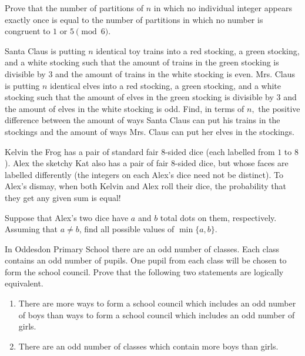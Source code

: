 \documentclass{article}
\begin{document}
\begin{req}[]{6}
Prove that the number of partitions of $n$ in which no individual integer appears exactly once is equal to the number of partitions in which no number is congruent to $1$ or $5\pmod{6}.$
\end{req}


\begin{prob}[ART 2020/4]{6}
Santa Claus is putting $n$ identical toy trains into a red stocking, a green stocking, and a white stocking such that the amount of trains in the green stocking is divisible by $3$ and the amount of trains in the white stocking is even. Mrs. Claus is putting $n$ identical elves into a red stocking, a green stocking, and a white stocking such that the amount of elves in the green stocking is divisible by $3$ and the amount of elves in the white stocking is odd. Find, in terms of $n,$ the positive difference between the amount of ways Santa Claus can put his trains in the stockings and the amount of ways Mrs. Claus can put her elves in the stockings.
\end{prob}

\begin{prob}[HMMT 2016]{9}
Kelvin the Frog has a pair of standard fair $8$-sided dice (each labelled from $1$ to $8$). Alex the sketchy Kat also has a pair of fair $8$-sided dice, but whose faces are labelled differently (the integers on each Alex's dice need not be distinct). To Alex's dismay, when both Kelvin and Alex roll their dice, the probability that they get any given sum is equal!

Suppose that Alex's two dice have $a$ and $b$ total dots on them, respectively. Assuming that $a \neq b$, find all possible values of $\min \{a,b\}$.
\end{prob}

\begin{req}{9}
In Oddesdon Primary School there are an odd number of classes. Each class contains an odd number of pupils. One pupil from each class will be chosen to form the school council. Prove that the following two statements are logically equivalent.
\begin{enumerate}
\item There are more ways to form a school council which includes an odd number of boys than ways to form a school council which includes an odd number of girls.

\item There are an odd number of classes which contain more boys than girls.
\end{enumerate}
\end{req}
\end{document}

